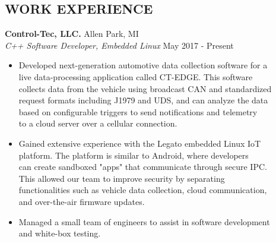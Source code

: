 \documentclass[margin,11pt]{res}
\begin{document}
\begin{resume}
\section{WORK EXPERIENCE}
\textbf{Control-Tec, LLC.} \hfill Allen Park, MI\\
\textsl{C++ Software Developer, Embedded Linux} \hfill May 2017 - Present
\begin{itemize}
	\itemsep -2pt
    \item Developed next-generation automotive data collection software for a\\
          live data-processing application called CT-EDGE. This software\\
          collects data from the vehicle using broadcast CAN and standardized\\
          request formats including J1979 and UDS, and can analyze the data\\
          based on configurable triggers to send notifications and telemetry\\
          to a cloud server over a cellular connection.
    \item Gained extensive experience with the Legato embedded Linux IoT\\
          platform. The platform is similar to Android, where developers\\
          can create sandboxed "apps" that communicate through secure IPC.\\
          This allowed our team to improve security by separating\\
          functionalities such as vehicle data collection, cloud communication,\\
          and over-the-air firmware updates.
    \item Managed a small team of engineers to assist in software development\\
          and white-box testing.
\end{itemize}


\end{resume}
\end{document}

